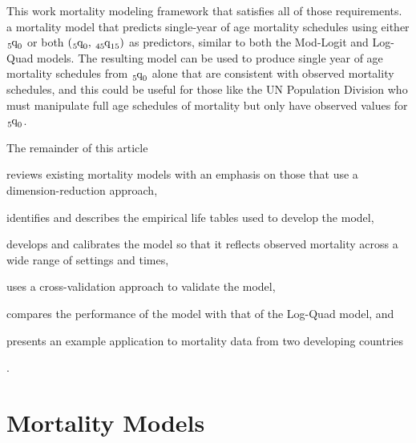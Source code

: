 \documentclass[11pt]{article}
\newcommand{\qf}{\tensor*[_5]{\mbox{q}}{_0}}
\newcommand{\qff}{\tensor*[_{45}]{\mbox{q}}{_{15}}}
\begin{document}
This work  mortality modeling framework that satisfies all of those requirements.   a mortality model that predicts single-year of age mortality schedules using either $\qf$ or both $\left(\qf, \, \qff \right)$ as predictors, similar to both the Mod-Logit and Log-Quad models.   The resulting model can be used to produce single year of age mortality schedules from $\qf$ alone that are consistent with observed mortality schedules, and this could be useful for those like the UN Population Division who must manipulate full age schedules of mortality but only have observed values for $\qf$.  

The remainder of this article
\begin{enumerate*}[label=\arabic*)]
\item reviews existing mortality models with an emphasis on those that use a dimension-reduction approach, 
\item identifies and describes the empirical life tables used to develop the model,
\item develops and calibrates the model so that it reflects observed mortality across a wide range of settings and times,
\item uses a cross-validation approach to validate the model,
\item compares the performance of the model with that of the Log-Quad model, and
\item presents an example application to mortality data from two developing countries
\end{enumerate*}.


\section{Mortality Models}
\end{document}
